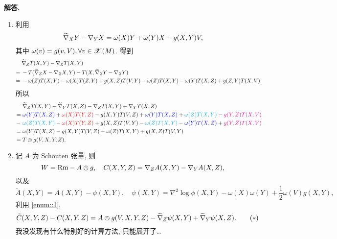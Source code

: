 \documentclass{ctexart}
\newenvironment{solution}{\par\noindent\textbf{解答. }}{\par}
\newcommand{\cred}{\textcolor{red}}
\newcommand{\cblue}{\textcolor{blue}}
\newcommand{\ccyan}{\textcolor{cyan}}
\newcommand{\cmag}{\textcolor{magenta}}
\begin{document}
\begin{solution}
    \begin{enumerate}
        \item\label{enum::1} 利用
        \[
            \widetilde{\nabla}_{X}Y - \nabla_{Y}X = \omega(X)Y + \omega(Y)X - g(X, Y)V,
        \]
        其中 $\omega(v) = g(v, V), \forall v \in \mathscr{X}(M)$. 得到
        \[
            \begin{aligned}
                 {} & \widetilde{\nabla}_{Z}T(X, Y) - \nabla_{Z}T(X, Y) \\
                ={} & -T(\widetilde{\nabla}_{Z}X - \nabla_{Z}X, Y) - T(X, \widetilde{\nabla}_{Z}Y - \nabla_{Z}Y) \\
                ={} & -\omega(Z)T(X, Y) - \omega(X)T(Z, Y) + g(X, Z)T(V, Y) - \omega(Z)T(X, Y) - \omega(Y)T(X, Z) + g(Z, Y)T(X, V).
            \end{aligned}
        \]
        所以
        \[
            \begin{aligned}
                  & \tDiv{Z}T(X, Y) - \tDiv{Y}T(X, Z) - \Div{Z}T(X, Y) + \Div{Y}T(X, Z) \\
                ={} & \cblue{\omega(Y)T(X, Z)} + \cred{\omega(X)T(Y, Z)} - g(X, Y)T(V, Z) + \cblue{\omega(Y)T(X, Z)} + \ccyan{\omega(Z)T(X, Y)} - \cmag{g(Y, Z)T(X, V)} \\
                -{\ } & \ccyan{\omega(Z)T(X, Y)} - \cred{\omega(X)T(Y, Z)} + g(X, Z)T(V, Y) - \ccyan{\omega(Z)T(X, Y)} - \cblue{\omega(Y)T(X, Z)} + \cmag{g(Y, Z)T(X, V)} \\
                ={} & \omega(Y)T(X, Z) - g(X, Y)T(V, Z) - \omega(Z)T(X, Y) + g(X, Z)T(V, Y) \\
                ={} & T \owedge g (V, X, Y, Z).
           \end{aligned}
        \]
        \item 记 $A$ 为 Schouten 张量, 则
        \[
            W = \mathrm{Rm} - A \owedge g, \quad C(X, Y, Z) = \nabla_{Z}A(X, Y) - \nabla_{Y}A(X, Z),
        \]
        以及 %
        \[
            \tilde{A}(X, Y) = A(X, Y) - \psi(X, Y), \quad \psi(X, Y) = \nabla^2 \log \phi (X, Y) - \omega(X)\omega(Y) + \dfrac{1}{2}\omega(V)g(X, Y),
        \]
        利用 \ref{enum::1}, 
        \[
            \tilde{C}(X, Y, Z) - C(X, Y, Z) = A \owedge g(V, X, Y, Z) - \widetilde{\nabla}_{Z}\psi(X, Y) + \widetilde{\nabla}_{Y}\psi(X, Z). \tag{$\ast$}\label{eq::1}
        \]
        我没发现有什么特别好的计算方法, 只能展开了\ldots{}


\end{enumerate}
\end{solution}
\end{document}

